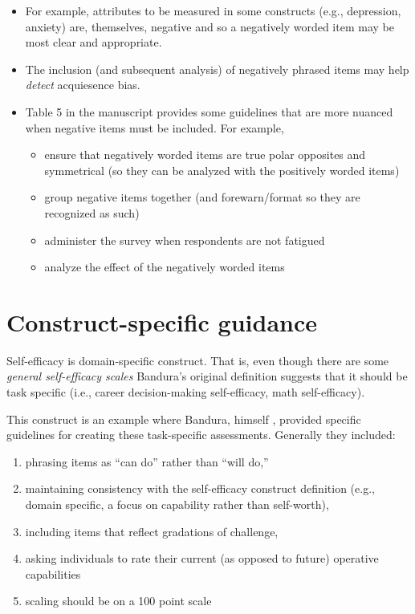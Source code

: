 \documentclass[
  english,
]{book}
\providecommand{\tightlist}{%
  \setlength{\itemsep}{0pt}\setlength{\parskip}{0pt}}
\begin{document}
\begin{itemize}
\tightlist
\item
  For example, attributes to be measured in some constructs (e.g., depression, anxiety) are, themselves, negative and so a negatively worded item may be most clear and appropriate.
\item
  The inclusion (and subsequent analysis) of negatively phrased items may help \emph{detect} acquiesence bias.
\item
  Table 5 in the manuscript provides some guidelines that are more nuanced when negative items must be included. For example,

  \begin{itemize}
  \tightlist
  \item
    ensure that negatively worded items are true polar opposites and symmetrical (so they can be analyzed with the positively worded items)
  \item
    group negative items together (and forewarn/format so they are recognized as such)
  \item
    administer the survey when respondents are not fatigued
  \item
    analyze the effect of the negatively worded items
  \end{itemize}
\end{itemize}

\hypertarget{construct-specific-guidance}{%
\section{Construct-specific guidance}\label{construct-specific-guidance}}

Self-efficacy is domain-specific construct. That is, even though there are some \emph{general self-efficacy scales} Bandura's original definition suggests that it should be task specific (i.e., career decision-making self-efficacy, math self-efficacy).

This construct is an example where Bandura, himself \citeyearpar{bandura_guide_2006}, provided specific guidelines for creating these task-specific assessments. Generally they included:

\begin{enumerate}
\def\labelenumi{\arabic{enumi}.}
\tightlist
\item
  phrasing items as ``can do'' rather than ``will do,''
\item
  maintaining consistency with the self-efficacy construct definition (e.g., domain specific, a focus on capability rather than self-worth),
\item
  including items that reflect gradations of challenge,
\item
  asking individuals to rate their current (as opposed to future) operative capabilities
\item
  scaling should be on a 100 point scale
\end{enumerate}
\end{document}
